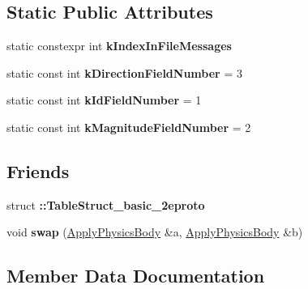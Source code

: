 \subsection*{Static Public Attributes}
\begin{DoxyCompactItemize}
\item 
static constexpr int {\bfseries k\+Index\+In\+File\+Messages}
\item 
\mbox{\label{classtbBasics_1_1ApplyPhysicsBody_a794a498a3d705c91852bed8ab112f620}} 
static const int {\bfseries k\+Direction\+Field\+Number} = 3
\item 
\mbox{\label{classtbBasics_1_1ApplyPhysicsBody_a8db848cb7b1f73589bdf407f46538ea8}} 
static const int {\bfseries k\+Id\+Field\+Number} = 1
\item 
\mbox{\label{classtbBasics_1_1ApplyPhysicsBody_a755bd5beedfeadb318505885c9b70c6a}} 
static const int {\bfseries k\+Magnitude\+Field\+Number} = 2
\end{DoxyCompactItemize}
\subsection*{Friends}
\begin{DoxyCompactItemize}
\item 
\mbox{\label{classtbBasics_1_1ApplyPhysicsBody_ae86a2f4c520666b65d606ccbe2122e61}} 
struct {\bfseries \+::\+Table\+Struct\+\_\+basic\+\_\+2eproto}
\item 
\mbox{\label{classtbBasics_1_1ApplyPhysicsBody_adb9d7c13a818cb90212c6cb502ef9a16}} 
void {\bfseries swap} (\hyperlink{classtbBasics_1_1ApplyPhysicsBody}{Apply\+Physics\+Body} \&a, \hyperlink{classtbBasics_1_1ApplyPhysicsBody}{Apply\+Physics\+Body} \&b)
\end{DoxyCompactItemize}


\subsection{Member Data Documentation}
\mbox{\label{classtbBasics_1_1ApplyPhysicsBody_a012f138363740aef47b3c3be5dd8f8d9}} 
